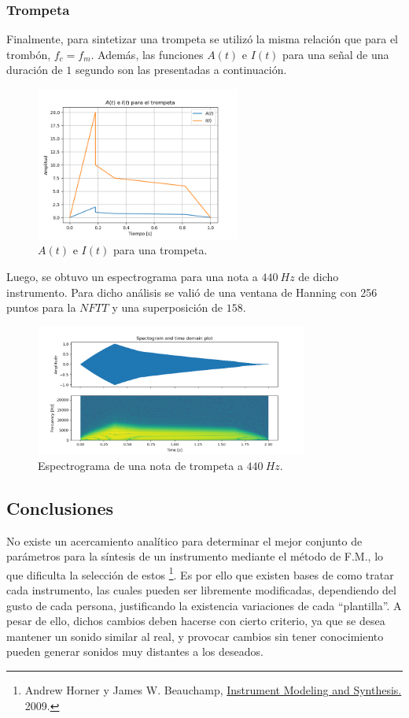 \subsubsection{Trompeta}
Finalmente, para sintetizar una trompeta se utilizó la misma relación que para el trombón, $f_c = f_m$. Además, las funciones $A(t)$ e $I(t)$ para una señal de una duración de $1$ segundo son las presentadas a continuación.
\begin{figure}[H]
	\centering
	\includegraphics[width=0.6\textwidth]{ImagenesEjercicio3/A-I-Trumpet.png}
	\caption{$A(t)$ e $I(t)$ para una trompeta.}
	\label{fig:aitrumpet}
\end{figure}

Luego, se obtuvo un espectrograma para una nota a $440 \ Hz$ de dicho instrumento. Para dicho análisis se valió de una ventana de Hanning con 256 puntos para la $NFTT$ y una superposición de $158$.  
\begin{figure}[H]
	\centering
	\includegraphics[width=0.8\textwidth]{ImagenesEjercicio3/Trumpet-440-Hanning-256-158.png}
	\caption{Espectrograma de una nota de trompeta a $440 \ Hz$.}
	\label{fig:spectrumpet}
\end{figure}
 
\subsection{Conclusiones}
No existe un acercamiento analítico para determinar el mejor conjunto de parámetros para la síntesis de un instrumento mediante el método de F.M., lo que dificulta la selección de estos \footnote{Andrew Horner y James W. Beauchamp, \href{https://www.researchgate.net/publication/226790075_Instrument_Modeling_and_Synthesis}{Instrument Modeling and Synthesis.} 2009.}. Es por ello que existen bases de como tratar cada instrumento, las cuales pueden ser libremente modificadas, dependiendo del gusto de cada persona, justificando la existencia variaciones de cada ``plantilla''. A pesar de ello, dichos cambios deben hacerse con cierto criterio, ya que se desea mantener un sonido similar al real, y provocar cambios sin tener conocimiento pueden generar sonidos muy distantes a los deseados.
